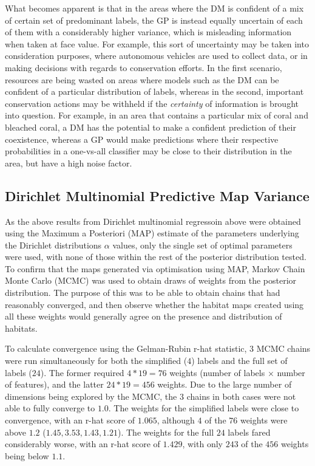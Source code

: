 What becomes apparent is that in the areas where the DM is confident of a mix of certain set of predominant labels, the GP is instead equally uncertain of each of them with a considerably higher variance, which is misleading information when taken at face value. For example, this sort of uncertainty may be taken into consideration purposes, where autonomous vehicles are used to collect data, or in making decisions with regards to conservation efforts. In the first scenario, resources are being wasted on areas where models such as the DM can be confident of a particular distribution of labels, whereas in the second, important conservation actions may be withheld if the \textit{certainty} of information is brought into question. For example, in an area that contains a particular mix of coral and bleached coral, a DM has the potential to make a confident prediction of their coexistence, whereas a GP would make predictions where their respective probabilities in a one-vs-all classifier may be close to their distribution in the area, but have a high noise factor.

\subsection{Dirichlet Multinomial Predictive Map Variance}

As the above results from Dirichlet multinomial regressoin above were obtained using the Maximum a Posteriori (MAP) estimate of the parameters underlying the Dirichlet distributions $\alpha$ values, only the single set of optimal parameters were used, with none of those within the rest of the posterior distribution tested. To confirm that the maps generated via optimisation using MAP, Markov Chain Monte Carlo (MCMC) was used to obtain draws of weights from the posterior distribution. The purpose of this was to be able to obtain chains that had reasonably converged, and then observe whether the habitat maps created using all these weights would generally agree on the presence and distribution of habitats. 

To calculate convergence using the Gelman-Rubin r-hat statistic, $3$ MCMC chains were run simultaneously for both the simplified ($4$) labels and the full set of labels ($24$). The former required $4*19=76$ weights (number of labels $\times$ number of features), and the latter $24*19=456$ weights. Due to the large number of dimensions being explored by the MCMC, the $3$ chains in both cases were not able to fully converge to $1.0$. The weights for the simplified labels were close to convergence, with an r-hat score of $1.065$, although $4$ of the $76$ weights were above $1.2$ ($1.45, 3.53, 1.43, 1.21$). The weights for the full $24$ labels fared considerably worse, with an r-hat score of $1.429$, with only $243$ of the $456$ weights being below $1.1$.

